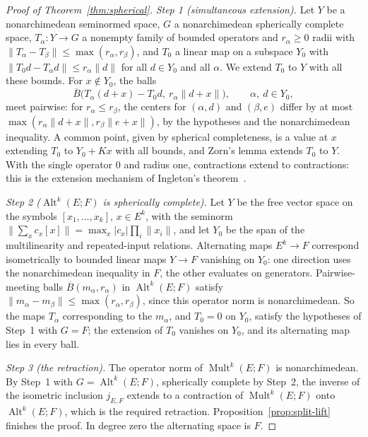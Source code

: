 \documentclass[11pt]{amsart}
\theoremstyle{definition}
\theoremstyle{remark}
\numberwithin{equation}{section}
\newcommand{\Alt}{\operatorname{Alt}}
\newcommand{\Mult}{\operatorname{Mult}}
\newcommand{\abs}[1]{\lvert #1\rvert}
\newcommand{\norm}[1]{\lVert #1\rVert}
\theoremstyle{plain}
\theoremstyle{definition}
\theoremstyle{plain}
\begin{document}
\begin{proof}[Proof of Theorem~\ref{thm:spherical}]
\emph{Step 1 (simultaneous extension).} Let $Y$ be a nonarchimedean seminormed space, $G$ a nonarchimedean
spherically complete space, $T_\alpha\colon Y\to G$ a nonempty family of bounded operators and $r_\alpha\ge0$ radii with
$\norm{T_\alpha-T_\beta}\le\max(r_\alpha,r_\beta)$, and $T_0$ a linear map on a subspace $Y_0$ with
$\norm{T_0d-T_\alpha d}\le r_\alpha\norm d$ for all $d\in Y_0$ and all $\alpha$. We extend $T_0$ to $Y$ with all
these bounds. For $x\notin Y_0$, the balls
\[
 \overline B\bigl(T_\alpha(d+x)-T_0d,\ r_\alpha\norm{d+x}\bigr),
 \qquad \alpha,\ d\in Y_0,
\]
meet pairwise: for $r_\alpha\le r_\beta$, the centers for $(\alpha,d)$ and $(\beta,e)$ differ by at most
$\max(r_\alpha\norm{d+x},r_\beta\norm{e+x})$, by the hypotheses and the nonarchimedean inequality. A common point, given
by spherical completeness, is a value at $x$ extending $T_0$ to $Y_0+Kx$ with all bounds, and Zorn's lemma extends $T_0$
to $Y$. With the single operator $0$ and radius one, contractions extend to contractions: this is the extension
mechanism of Ingleton's theorem~\cite{In}.

\emph{Step 2 ($\Alt^k(E;F)$ is spherically complete).} Let $Y$ be the free vector space on the symbols
$[x_1,\ldots,x_k]$, $x\in E^k$, with the seminorm $\norm{\sum_x c_x[x]}=\max_x\abs{c_x}\prod_i\norm{x_i}$, and let $Y_0$
be the span of the multilinearity and repeated-input relations. Alternating maps $E^k\to F$ correspond isometrically to
bounded linear maps $Y\to F$ vanishing on $Y_0$: one direction uses the nonarchimedean inequality in $F$, the other
evaluates on generators. Pairwise-meeting balls $\overline B(m_\alpha,r_\alpha)$ in $\Alt^k(E;F)$ satisfy
$\norm{m_\alpha-m_\beta}\le\max(r_\alpha,r_\beta)$, since this operator norm is nonarchimedean. So the maps $T_\alpha$
corresponding to the $m_\alpha$, and $T_0=0$ on $Y_0$, satisfy the hypotheses of Step~1 with $G=F$; the extension of
$T_0$ vanishes on $Y_0$, and its alternating map lies in every ball.

\emph{Step 3 (the retraction).} The operator norm of $\Mult^k(E;F)$ is nonarchimedean. By Step~1 with
$G=\Alt^k(E;F)$, spherically complete by Step~2, the inverse of the isometric inclusion $j_{E,F}$ extends to a contraction
of $\Mult^k(E;F)$ onto $\Alt^k(E;F)$, which is the required retraction. Proposition~\ref{prop:split-lift} finishes the
proof. In degree zero the alternating space is $F$.
\end{proof}
\end{document}
